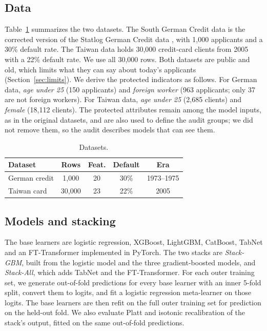 \subsection{Data}
Table~\ref{tab:data} summarizes the two datasets. The South German Credit data \cite{r21} is the corrected version of the Statlog German Credit data \cite{r17,r22}, with 1{,}000 applicants and a 30\% default rate. The Taiwan data \cite{r31,r33} holds 30{,}000 credit-card clients from 2005 with a 22\% default rate. We use all 30{,}000 rows. Both datasets are public and old, which limits what they can say about today's applicants (Section~\ref{sec:limits}). We derive the protected indicators as follows. For German data, \emph{age under 25} (150 applicants) and \emph{foreign worker} (963 applicants; only 37 are not foreign workers). For Taiwan data, \emph{age under 25} (2{,}685 clients) and \emph{female} (18{,}112 clients). The protected attributes remain among the model inputs, as in the original datasets, and are also used to define the audit groups; we did not remove them, so the audit describes models that can see them.

\begin{table}[t]
\centering
\caption{Datasets.}
\label{tab:data}
\small
\setlength{\tabcolsep}{3pt}
\begin{tabular}{lcccc}
\toprule
Dataset & Rows & Feat. & Default & Era\\
\midrule
German credit & 1{,}000 & 20 & 30\% & 1973--1975\\
Taiwan card & 30{,}000 & 23 & 22\% & 2005\\
\bottomrule
\end{tabular}
\end{table}

\subsection{Models and stacking}
The base learners are logistic regression, XGBoost, LightGBM, CatBoost, TabNet and an FT-Transformer implemented in PyTorch. The two stacks are \emph{Stack-GBM}, built from the logistic model and the three gradient-boosted models, and \emph{Stack-All}, which adds TabNet and the FT-Transformer. For each outer training set, we generate out-of-fold predictions for every base learner with an inner 5-fold split, convert them to logits, and fit a logistic regression meta-learner on those logits. The base learners are then refit on the full outer training set for prediction on the held-out fold. We also evaluate Platt and isotonic recalibration of the stack's output, fitted on the same out-of-fold predictions.

